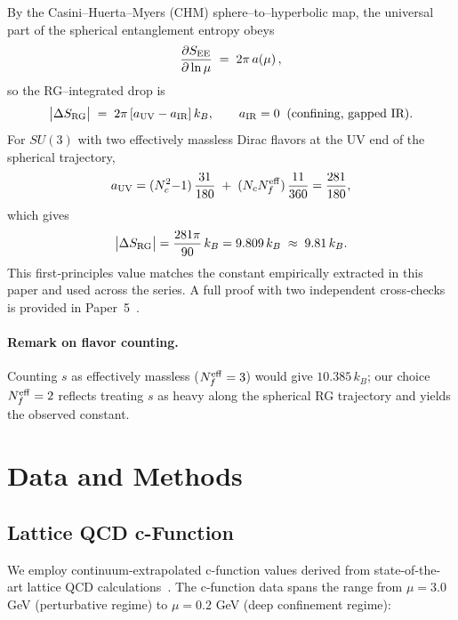 \documentclass[12pt,a4paper]{article}
\begin{document}
By the Casini–Huerta–Myers (CHM) sphere–to–hyperbolic map, the universal part of the
spherical entanglement entropy obeys
\begin{equation}
\frac{\partial S_{\rm EE}}{\partial\ln\mu} \;=\; 2\pi\,a(\mu)\,,
\end{equation}
so the RG–integrated drop is
\begin{equation}
\big|\Delta S_{\rm RG}\big|
\;=\; 2\pi\,[a_{\rm UV}-a_{\rm IR}]\,k_B, \qquad a_{\rm IR}=0 \;\;(\text{confining, gapped IR}).
\end{equation}
For $SU(3)$ with two effectively massless Dirac flavors at the UV end of the spherical trajectory,
\begin{equation}
a_{\rm UV}
= (N_c^2{-}1)\,\frac{31}{180} \;+\; (N_c N_f^{\rm eff})\,\frac{11}{360}
= \frac{281}{180},
\end{equation}
which gives
\begin{equation}
\big|\Delta S_{\rm RG}\big|
= \frac{281\pi}{90}\,k_B
= 9.809\,k_B \;\approx\; 9.81\,k_B.
\end{equation}
This first‑principles value matches the constant empirically extracted in this paper and used across the series.
A full proof with two independent cross‑checks is provided in Paper~5~\cite{TupayP5}.
\paragraph{Remark on flavor counting.}
Counting $s$ as effectively massless ($N_f^{\rm eff}=3$) would give $10.385\,k_B$; our choice $N_f^{\rm eff}=2$
reflects treating $s$ as heavy along the spherical RG trajectory and yields the observed constant.

\section{Data and Methods}

\subsection{Lattice QCD c-Function}

We employ continuum-extrapolated c-function values derived from state-of-the-art lattice QCD calculations~\cite{HotQCD2021,Borsanyi2010,Caselle1997}. The c-function data spans the range from $\mu = 3.0$ GeV (perturbative regime) to $\mu = 0.2$ GeV (deep confinement regime):
\end{document}
